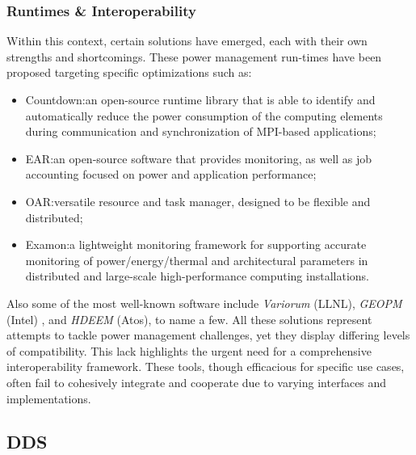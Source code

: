 \subsubsection {Runtimes \& Interoperability} \label{SSEC:runtimes}
Within this context, certain solutions have emerged, each with their own strengths and shortcomings. These power management run-times have been proposed targeting specific optimizations such as:
\begin{itemize}
    \item Countdown\cite{cesarini2019countdown}:\@ an open-source runtime library that is able to identify and automatically reduce the power consumption of the computing elements during communication and synchronization of MPI-based applications;
    \item EAR\cite{ear}:\@ an open-source software that provides monitoring, as well as job accounting focused on power and application performance;
    \item OAR\cite{oar}:\@ versatile resource and task manager, designed to be flexible and distributed;
    \item Examon\cite{Examon}:\@  a lightweight monitoring framework for supporting accurate monitoring of power/energy/thermal and architectural parameters in distributed and large-scale high-performance computing installations.
\end{itemize}

Also some of the most well-known software include \emph{Variorum} (LLNL), \emph{GEOPM} (Intel) \cite{GEOPM}, and \emph{HDEEM} (Atos)\cite{HDEEM}, to name a few.
All these solutions represent attempts to tackle power management challenges, yet they display differing levels of compatibility. This lack highlights the urgent need for a comprehensive interoperability framework. These tools, though efficacious for specific use cases, often fail to cohesively integrate and cooperate due to varying interfaces and implementations.

\subsection{DDS}

